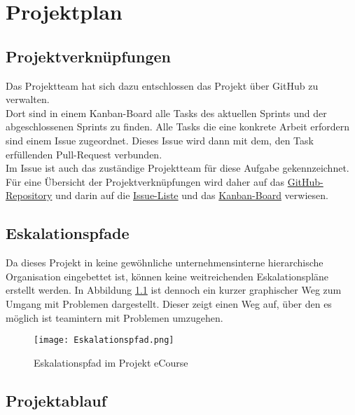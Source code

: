 \chapter{Projektplan}

\section{Projektverknüpfungen}

Das Projektteam hat sich dazu entschlossen das Projekt über \gls{GitHub} zu verwalten. \\
Dort sind in einem \gls{Kanban-Board} alle Tasks des aktuellen \gls{Sprint}s und der abgeschlossenen \gls{Sprint}s zu finden. Alle Tasks die eine konkrete Arbeit erfordern sind einem \gls{Issue} zugeordnet. Dieses \gls{Issue} wird dann mit dem, den Task erfüllenden \gls{Pull-Request} verbunden. \\
Im \gls{Issue} ist auch das zuständige Projektteam für diese Aufgabe gekennzeichnet.\\
Für eine Übersicht der Projektverknüpfungen wird daher auf das \href{https://github.com/LucRome/SWE_Semester4/}{GitHub-Repository} und darin auf die \href{https://github.com/LucRome/SWE_Semester4/issues}{Issue-Liste} und das \href{https://github.com/LucRome/SWE_Semester4/projects/1}{Kanban-Board} verwiesen.
\section{Eskalationspfade}
Da dieses Projekt in keine gewöhnliche unternehmensinterne hierarchische Organisation eingebettet ist, können keine weitreichenden Eskalationspläne erstellt werden. In Abbildung \ref{fib:Eskalationspfad} ist dennoch ein kurzer graphischer Weg zum Umgang mit Problemen dargestellt. Dieser zeigt einen Weg auf, über den es möglich ist teamintern mit Problemen umzugehen.\\

\begin{figure}[h]
\centering
\texttt{[image: Eskalationspfad.png]}
\caption{Eskalationspfad im Projekt eCourse}
\label{fib:Eskalationspfad}
\end{figure}

\section{Projektablauf}

